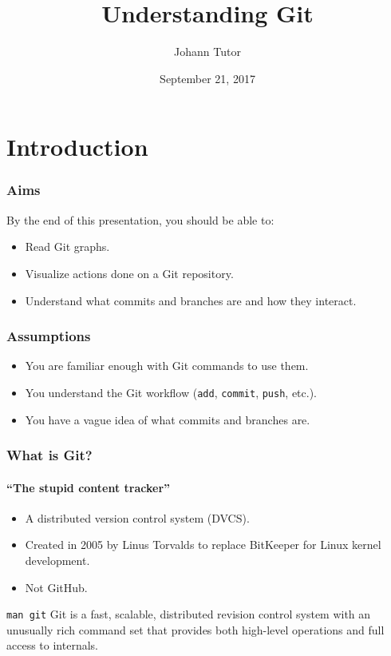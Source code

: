 \documentclass{beamer}
\title{Understanding Git}
\author{Johann Tutor}
\date{September 21, 2017}
\newcommand\gitsubcmd[1]{\texttt{#1}}
\begin{document}

\section{Introduction}

\begin{frame}
  \frametitle{Aims}
  By the end of this presentation, you should be able to:
  \begin{itemize}
    \item Read Git graphs.
    \item Visualize actions done on a Git repository.
    \item Understand what commits and branches are and how they interact.
  \end{itemize}
\end{frame}

\begin{frame}
  \frametitle{Assumptions}
  \begin{itemize}
    \item You are familiar enough with Git commands to use them.
    \item You understand the Git workflow (\gitsubcmd{add}, \gitsubcmd{commit}, \gitsubcmd{push}, etc.).
    \item You have a vague idea of what commits and branches are.
  \end{itemize}
\end{frame}

\begin{frame}
  \frametitle{What is Git?}
  \framesubtitle{``The stupid content tracker''}
  \begin{itemize}
    \item A distributed version control system (DVCS).
    \item Created in 2005 by Linus Torvalds to replace BitKeeper for Linux kernel development.
    \item Not GitHub.
  \end{itemize}
  \vfill
  \begin{block}{\texttt{man git}}
    Git is a fast, scalable, distributed revision control system with an
    unusually rich command set that provides both high-level operations and
    full access to internals.
  \end{block}
\end{frame}
\end{document}
